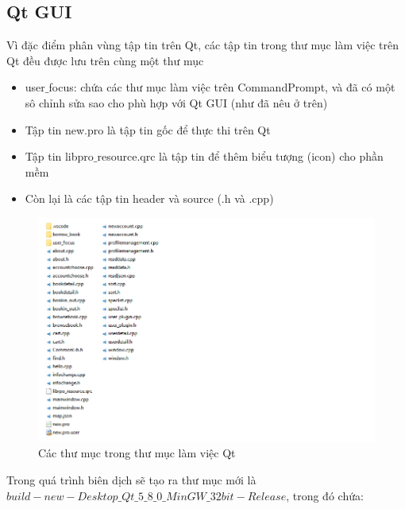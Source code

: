 \documentclass[12pt,a4paper]{report}
\begin{document}
            \subsection{Qt GUI}
            Vì đặc điểm phân vùng tập tin trên Qt, các tập tin trong thư mục làm việc trên Qt đều được lưu trên cùng một thư mục
            \begin{itemize}
                \item user$\_$focus: chứa các thư mục làm việc trên CommandPrompt, và đã có một sô chỉnh sửa sao cho phù hợp với Qt GUI (như đã nêu ở trên)
                \item Tập tin new.pro là tập tin gốc để thực thi trên Qt
                \item Tập tin libpro$\_$resource.qrc là tập tin để thêm biểu tượng (icon) cho phần mềm
                \item Còn lại là các tập tin header và source (.h và .cpp)
            \end{itemize}
            \begin{figure}[H]
                \centering

                \label{F:qtfolder}
                \includegraphics[scale = 1]{qtfolder.png}
                \caption{Các thư mục trong thư mục làm việc Qt}
            \end{figure}
            Trong quá trình biên dịch sẽ tạo ra thư mục mới là \textbf{$build-new-Desktop\_Qt\_5\_8\_0\_MinGW\_32bit-Release$}, trong đó chứa:
\end{document}
